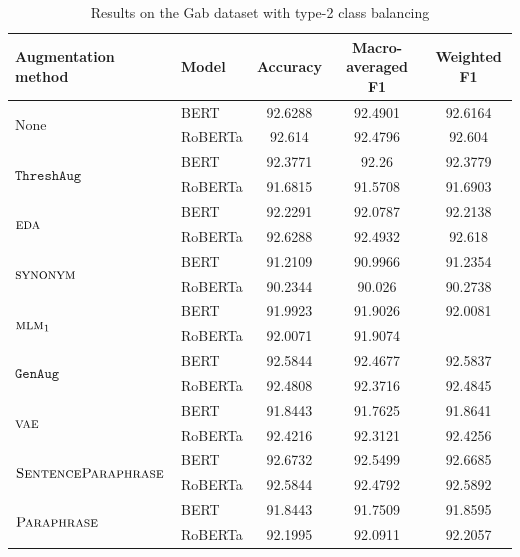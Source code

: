 \documentclass[11pt,a4paper]{article}
\newcommand{\noaug}{$\textrm{None}$}
\newcommand{\senttfpara}{$\textsc{SentenceParaphrase}$}
\newcommand{\tfpara}{$\textsc{Paraphrase}$}
\newcommand{\eda}{$\textsc{eda}$}
\newcommand{\synonym}{$\textsc{synonym}$}
\newcommand{\mlmone}{$\textsc{mlm}_1$}
\newcommand{\mlmfive}{$\textsc{mlm}_5$}
\newcommand{\genaug}{$\texttt{GenAug}$}
\newcommand{\threshaug}{$\texttt{ThreshAug}$}
\newcommand{\vae}{$\textsc{vae}$}
\begin{document}
\begin{table}[]
    \small
    \centering
    \begin{tabular}{llccc}
        \toprule
        \textbf{Augmentation method} & \textbf{Model} & \textbf{Accuracy} & \textbf{Macro-averaged F1} & \textbf{Weighted F1} \\
        \midrule
        \multirow{2}{*}{\noaug} & BERT & 92.6288 & 92.4901 & 92.6164 \\
         & RoBERTa & 92.614 & 92.4796 & 92.604 \\\midrule
        
        \multirow{2}{*}{\threshaug} & BERT & 92.3771 & 92.26 & 92.3779 \\
         & RoBERTa & 91.6815 & 91.5708 & 91.6903 \\\cmidrule{2-5}
        \multirow{2}{*}{\eda} & BERT & 92.2291 & 92.0787 & 92.2138 \\
         & RoBERTa & 92.6288 & 92.4932 & 92.618 \\\midrule

        \multirow{2}{*}{\synonym} & BERT & 91.2109 & 90.9966 & 91.2354 \\
         & RoBERTa & 90.2344 & 90.026 & 90.2738 \\\cmidrule{2-5}
        \multirow{2}{*}{\mlmone} & BERT & 91.9923 & 91.9026 & 92.0081 \\
         & RoBERTa & 92.0071 & 91.9074 &  \\
         \midrule
         
        \multirow{2}{*}{\genaug} & BERT & 92.5844 & 92.4677 & 92.5837\\
         & RoBERTa & 92.4808 & 92.3716 & 92.4845\\
         \cmidrule{2-5}
        \multirow{2}{*}{\vae} & BERT & 91.8443 & 91.7625 & 91.8641 \\
        & RoBERTa & 92.4216 & 92.3121 & 92.4256 \\
        \midrule
         
        \multirow{2}{*}{\senttfpara} & BERT & 92.6732 & 92.5499 & 92.6685 \\
         & RoBERTa & 92.5844 & 92.4792 & 92.5892 \\\cmidrule{2-5}
        \multirow{2}{*}{\tfpara} & BERT & 91.8443 & 91.7509 & 91.8595 \\
         & RoBERTa & 92.1995 & 92.0911 & 92.2057 \\
        \bottomrule
    \end{tabular}
    \caption{Results on the Gab dataset with type-2 class balancing}
    \label{tab:gab2}
\end{table}
\end{document}

